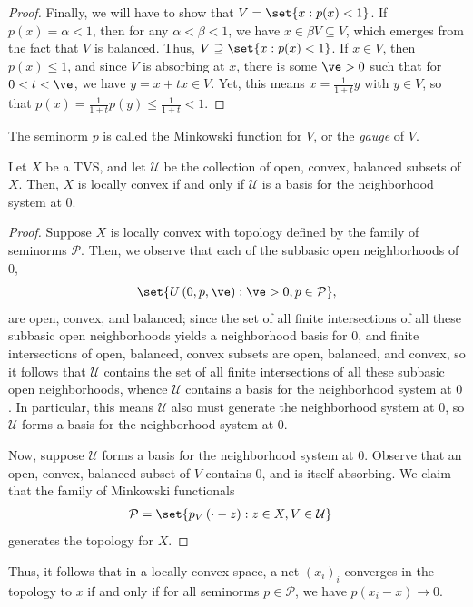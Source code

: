 \documentclass[10pt]{mypackage}
\begin{document}
\begin{proof}
  Finally, we will have to show that $V = \set{x : p(x) < 1}$. If $p(x) = \alpha < 1$, then for any $\alpha < \beta < 1$, we have $x\in \beta V\subseteq V$, which emerges from the fact that $V$ is balanced. Thus, $V \supseteq \set{x : p(x) < 1}$. If $x\in V$, then $p(x)\leq 1$, and since $V$ is absorbing at $x$, there is some $\ve > 0$ such that for $0 < t < \ve$, we have $y = x + tx\in V$. Yet, this means $x = \frac{1}{1+t}y$ with $y\in V$, so that $p(x) = \frac{1}{1 + t}p(y)\leq \frac{1}{1+t} < 1$.
\end{proof}
The seminorm $p$ is called the Minkowski function for $V$, or the \textit{gauge} of $V$.
\begin{proposition}
  Let $X$ be a TVS, and let $\mathcal{U}$ be the collection of open, convex, balanced subsets of $X$. Then, $X$ is locally convex if and only if $ \mathcal{U} $ is a basis for the neighborhood system at $0$.
\end{proposition}
\begin{proof}
  Suppose $X$ is locally convex with topology defined by the family of seminorms $ \mathcal{P} $. Then, we observe that each of the subbasic open neighborhoods of $0$, 
  \begin{align*}
    \set{U\left( 0,p,\ve \right) : \ve > 0,p\in \mathcal{P}},
  \end{align*}
  are open, convex, and balanced; since the set of all finite intersections of all these subbasic open neighborhoods yields a neighborhood basis for $0$, and finite intersections of open, balanced, convex subsets are open, balanced, and convex, so it follows that $\mathcal{U}$ contains the set of all finite intersections of all these subbasic open neighborhoods, whence $ \mathcal{U} $ contains a basis for the neighborhood system at $0$. In particular, this means $\mathcal{U}$ also must generate the neighborhood system at $0$, so $\mathcal{U}$ forms a basis for the neighborhood system at $0$.

  Now, suppose $\mathcal{U}$ forms a basis for the neighborhood system at $0$. Observe that an open, convex, balanced subset of $V$ contains $0$, and is itself absorbing. We claim that the family of Minkowski functionals
  \begin{align*}
    \mathcal{P} &= \set{p_V\left( \cdot - z \right) : z\in X, V\in \mathcal{U}}
  \end{align*}
  generates the topology for $X$.
\end{proof}
Thus, it follows that in a locally convex space, a net $\left( x_{i} \right)_i$ converges in the topology to $x$ if and only if for all seminorms $p\in \mathcal{P}$, we have $p\left( x_i - x \right)\rightarrow 0$.
\end{document}
